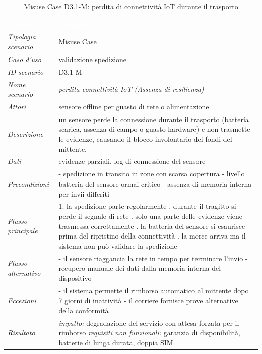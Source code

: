 \begin{longtable}{| >{\columncolor{misuseCol}}p{} | p{} |}
\caption{Misuse Case D3.1-M: perdita di connettività IoT durante il trasporto}\label{tab:d31m}\\
\hline
\rowcolor{misuseHeader} \textcolor{white}{\textit{Campo}} & \textcolor{white}{\textit{Contenuto}} \\
\hline
\textit{Tipologia scenario} & Misuse Case \\
\hline
\textit{Caso d'uso} & validazione spedizione \\
\hline
\textit{ID scenario} & D3.1-M \\
\hline
\textit{Nome scenario} & \textit{perdita connettività IoT (Assenza di resilienza)} \\
\hline
\textit{Attori} & sensore offline per guasto di rete o alimentazione \\
\hline
\textit{Descrizione} & un sensore perde la connessione durante il trasporto (batteria scarica, assenza di campo o guasto hardware) e non trasmette le evidenze, causando il blocco involontario dei fondi del mittente. \\
\hline
\textit{Dati} & evidenze parziali, log di connessione del sensore \\
\hline
\textit{Precondizioni} & - spedizione in transito in zone con scarsa copertura \newline - livello batteria del sensore ormai critico \newline - assenza di memoria interna per invii differiti \\
\hline
\textit{Flusso principale} & 1. la spedizione parte regolarmente \newline 2. durante il tragitto si perde il segnale di rete \newline 3. solo una parte delle evidenze viene trasmessa correttamente \newline 4. la batteria del sensore si esaurisce prima del ripristino della connettività \newline 5. la merce arriva ma il sistema non può validare la spedizione \\
\hline
\textit{Flusso alternativo} & - il sensore riaggancia la rete in tempo per terminare l'invio \newline - recupero manuale dei dati dalla memoria interna del dispositivo \\
\hline
\textit{Eccezioni} & - il sistema permette il rimborso automatico al mittente dopo 7 giorni di inattività \newline - il corriere fornisce prove alternative della conformità \\
\hline
\textit{Risultato} & \textit{impatto:} degradazione del servizio con attesa forzata per il rimborso \newline \textit{requisiti non funzionali:} garanzia di disponibilità, batterie di lunga durata, doppia SIM \\
\hline
\end{longtable}

